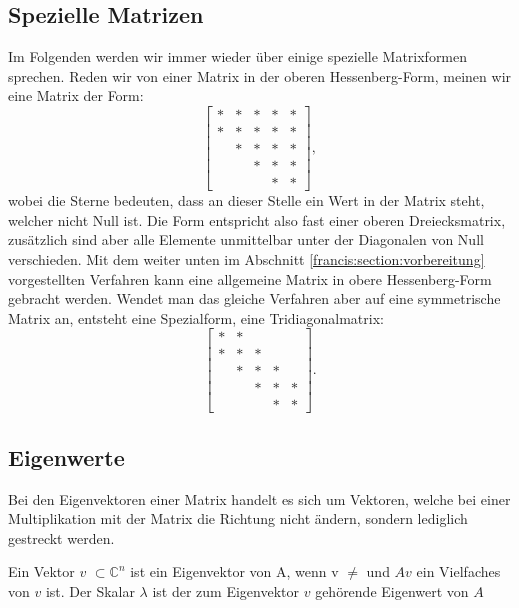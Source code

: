 \subsection{Spezielle Matrizen\label{francis:section:grundlagen:spezielle_matrizen}}
Im Folgenden werden wir immer wieder über einige spezielle Matrixformen sprechen.
Reden wir von einer Matrix in der oberen Hessenberg-Form, meinen wir eine Matrix der Form:
%
%
\begin{equation}
	\begin{bmatrix}
	* & * & * & * & * \\
	* & * & * & * & * \\
	& * & * & * & * \\
	&   & * & * & * \\
	&   &   & * & *
	\end{bmatrix},
\end{equation}
wobei die Sterne bedeuten, dass an dieser Stelle ein Wert in der Matrix steht, welcher nicht Null ist.
Die Form entspricht also fast einer oberen Dreiecksmatrix, zusätzlich sind aber alle Elemente unmittelbar unter der Diagonalen von Null verschieden.
Mit dem weiter unten im Abschnitt \ref{francis:section:vorbereitung} vorgestellten Verfahren kann eine allgemeine Matrix in obere Hessenberg-Form gebracht werden. Wendet man das gleiche Verfahren aber auf eine symmetrische Matrix an, entsteht eine Spezialform, eine Tridiagonalmatrix:
%
\begin{equation}
	\begin{bmatrix}
	* & * &   &   &   \\
	* & * & *  &   &   \\
	& * & * & * &  \\
	&   & * & * & * \\
	&   &   & * & *
	\end{bmatrix}.
\end{equation}

\subsection{Eigenwerte\label{francis:section:grundlagen:eigenwerte}}
Bei den Eigenvektoren einer Matrix handelt es sich um Vektoren, welche bei einer Multiplikation mit der Matrix die Richtung nicht ändern, sondern lediglich gestreckt werden.

\begin{satz}
	Ein Vektor $v$ $\subset \mathbb{C}^n$ ist ein Eigenvektor von A, wenn v $\neq$ und $Av$ ein Vielfaches von $v$ ist. Der Skalar $\lambda$ ist der zum Eigenvektor $v$ gehörende Eigenwert von $A$
\end{satz}

